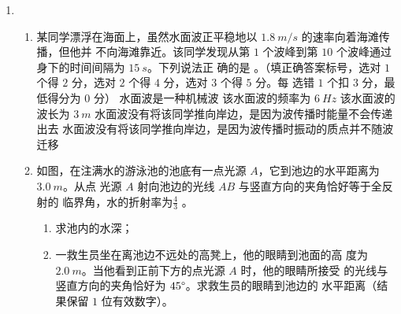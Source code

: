 \begin{enumerate}
\item 
{}
\begin{enumerate}
	\item
某同学漂浮在海面上，虽然水面波正平稳地以 $ 1.8 \ m /s $ 的速率向着海滩传播，但他并
不向海滩靠近。该同学发现从第 $ 1 $ 个波峰到第 $ 10 $ 个波峰通过身下的时间间隔为 $ 15 \ s $。下列说法正
确的是 \underlinegap 。（填正确答案标号，选对 $ 1 $ 个得 $ 2 $ 分，选对 $ 2 $ 个得 $ 4 $ 分，选对 $ 3 $ 个得 $ 5 $ 分。每
选错 $ 1 $ 个扣 $ 3 $ 分，最低得分为 $ 0 $ 分）
\fivechoices
{水面波是一种机械波}
{该水面波的频率为 $ 6 \ Hz $}
{该水面波的波长为 $ 3 \ m $}
{水面波没有将该同学推向岸边，是因为波传播时能量不会传递出去}
{水面波没有将该同学推向岸边，是因为波传播时振动的质点并不随波迁移}



\item 
如图，在注满水的游泳池的池底有一点光源 $ A $，它到池边的水平距离为 $ 3.0 \ m $。从点
光源 $ A $ 射向池边的光线 $ AB $ 与竖直方向的夹角恰好等于全反射的
临界角，水的折射率为$  \frac{ 4 }{ 3 }  $ 。
\begin{enumerate}
	\item
求池内的水深；

\item 
一救生员坐在离池边不远处的高凳上，他的眼睛到池面的高
度为 $ 2.0 \ m $。当他看到正前下方的点光源 $ A $ 时，他的眼睛所接受
的光线与竖直方向的夹角恰好为 $ 45 \degree $。求救生员的眼睛到池边的
水平距离（结果保留 $ 1 $ 位有效数字）。
	
\end{enumerate}
\begin{figure}[h!]
	\flushright
	
\end{figure}


\end{enumerate}
\end{enumerate}
